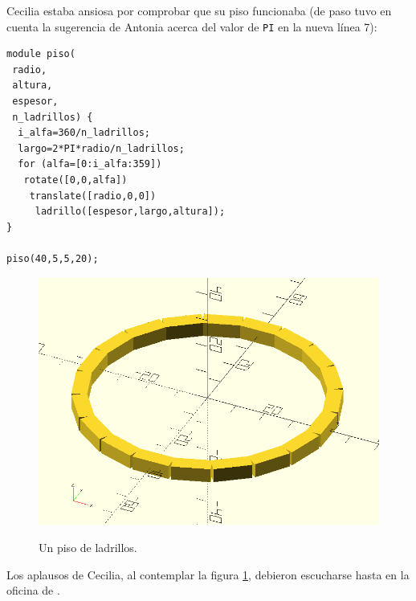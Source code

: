     Cecilia estaba ansiosa por comprobar que su piso funcionaba (de
    paso tuvo en cuenta la sugerencia de Antonia acerca del valor de
    \texttt{PI} en la nueva línea 7):

\begin{lstlisting}
module piso(
 radio,
 altura,
 espesor,
 n_ladrillos) {
  i_alfa=360/n_ladrillos;
  largo=2*PI*radio/n_ladrillos; 
  for (alfa=[0:i_alfa:359])
   rotate([0,0,alfa])
    translate([radio,0,0])
     ladrillo([espesor,largo,altura]); 
}
   
piso(40,5,5,20);
\end{lstlisting}


\begin{figure}[ht]
  \centering
  \includegraphics[width=.75\textwidth]{imagenes/piso}  
  \caption{Un piso de ladrillos.}\iftoggle{libro}{}{\vspace{128in}}
  \label{fig:piso}
\end{figure}

    
Los aplausos de Cecilia, al contemplar la figura \ref{fig:piso},
debieron escucharse hasta en la oficina de \director.


